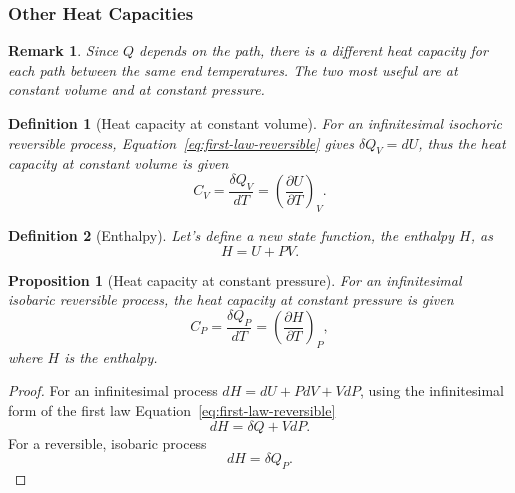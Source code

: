 \documentclass{article}
\newtheorem{definition}{Definition}
\newtheorem{remark}{Remark}
\newtheorem{proposition}{Proposition}
\begin{document}
\subsubsection{Other Heat Capacities}
\begin{remark}
    Since $Q$ depends on the path, there is a different heat capacity for each path between the same end temperatures. The two most useful are at constant volume and at constant pressure.
\end{remark}
\begin{definition}[Heat capacity at constant volume]
    For an infinitesimal isochoric reversible process, Equation~\eqref{eq:first-law-reversible} gives $\delta Q_V = dU$, thus the heat capacity at constant volume is given
    \begin{equation}
        \label{eq:heat-capacity-volume}
        C_V = \frac{\delta Q_V}{dT} = \left(\frac{\partial U}{\partial T}\right)_V.
    \end{equation}
\end{definition}
\begin{definition}[Enthalpy]
    Let's define a new state function, the enthalpy $H$, as
    \begin{equation}
        \label{eq:enthalpy}
        H=U+PV.
    \end{equation}
\end{definition}
\begin{proposition}[Heat capacity at constant pressure]
    For an infinitesimal isobaric reversible process, the heat capacity at constant pressure is given
    \begin{equation}
        \label{eq:heat-capacity-pressure}
        C_P = \frac{\delta Q_P}{dT} = \left(\frac{\partial H}{\partial T}\right)_P,
    \end{equation}
    where $H$ is the enthalpy.
\end{proposition}
\begin{proof}
    For an infinitesimal process $dH = dU+PdV+VdP$, using the infinitesimal form of the first law Equation~\eqref{eq:first-law-reversible}
    \[dH = \delta Q + VdP.\]
    For a reversible, isobaric process
    \[dH = \delta Q_P.\]
\end{proof}
\end{document}
